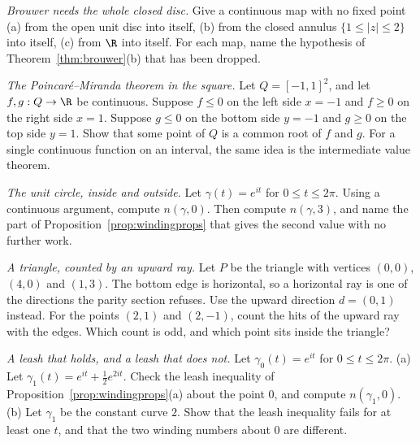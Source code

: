 \begin{exercise}[$\star$]\label{ex:brouwerfails}
\emph{Brouwer needs the whole closed disc.} Give a continuous map with no fixed point (a) from the open unit disc into itself, (b) from the closed annulus
$\{1\le|z|\le2\}$ into itself, (c) from $\R$ into itself. For each map, name the hypothesis of Theorem~\ref{thm:brouwer}(b) that has been dropped.
\end{exercise}

\begin{exercise}[$\star\star$]\label{ex:miranda}
\emph{The Poincar\'e--Miranda theorem in the square.} Let $Q=[-1,1]^2$, and let $f,g:Q\to\R$ be continuous. Suppose $f\le0$ on the left side $x=-1$ and $f\ge0$ on the right side $x=1$. Suppose $g\le0$ on the bottom side $y=-1$ and $g\ge0$ on the top side $y=1$. Show that some point of $Q$ is a common root of $f$ and $g$. For a single continuous function on an interval, the same idea is the intermediate value theorem.
\end{exercise}

\begin{exercise}[$\star$]\label{ex:v7c06a}
\emph{The unit circle, inside and outside.} Let $\gamma(t)=e^{it}$ for $0\le t\le2\pi$. Using a continuous argument, compute $n(\gamma,0)$. Then compute $n(\gamma,3)$, and name the part of Proposition~\ref{prop:windingprops} that gives the second value with no further work.
\end{exercise}

\begin{exercise}[$\star$]\label{ex:v7c06b}
\emph{A triangle, counted by an upward ray.} Let $P$ be the triangle with vertices $(0,0)$, $(4,0)$ and $(1,3)$. The bottom edge is horizontal, so a horizontal ray is one of the directions the parity section refuses. Use the upward direction $d=(0,1)$ instead. For the points $(2,1)$ and $(2,-1)$, count the hits of the upward ray with the edges. Which count is odd, and which point sits inside the triangle?
\end{exercise}

\begin{exercise}[$\star\star$]\label{ex:v7c06c}
\emph{A leash that holds, and a leash that does not.} Let $\gamma_0(t)=e^{it}$ for $0\le t\le2\pi$. (a) Let $\gamma_1(t)=e^{it}+\frac12 e^{2it}$. Check the leash inequality of Proposition~\ref{prop:windingprops}(a) about the point $0$, and compute $n(\gamma_1,0)$. (b) Let $\gamma_1$ be the constant curve $2$. Show that the leash inequality fails for at least one $t$, and that the two winding numbers about $0$ are different.
\end{exercise}

